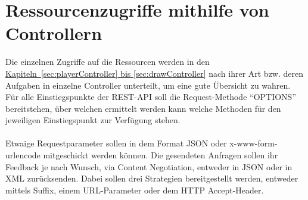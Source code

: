 \section{Ressourcenzugriffe mithilfe von Controllern}
Die einzelnen Zugriffe auf die Ressourcen werden in den \hyperref[sec:playerController, sec:drawController]{Kapiteln~\ref{sec:playerController} bis \ref{sec:drawController}} nach ihrer Art bzw. deren Aufgaben in einzelne Controller unterteilt, um eine gute Übersicht zu wahren. Für alle Einstiegspunkte der \gls{REST}-\gls{API} soll die Request-Methode \enquote{OPTIONS} bereitstehen, über welchen ermittelt werden kann welche Methoden für den jeweiligen Einstiegspunkt zur Verfügung stehen.\\
\\
Etwaige Requestparameter sollen in dem Format \gls{JSON} oder x-www-form-urlencode mitgeschickt werden können. Die gesendeten Anfragen sollen ihr Feedback je nach Wunsch, via Content Negotiation, entweder in \gls{JSON} oder in \gls{XML} zurücksenden. Dabei sollen drei Strategien bereitgestellt werden, entweder mittels Suffix, einem URL-Parameter oder dem \gls{HTTP} Accept-Header. 


